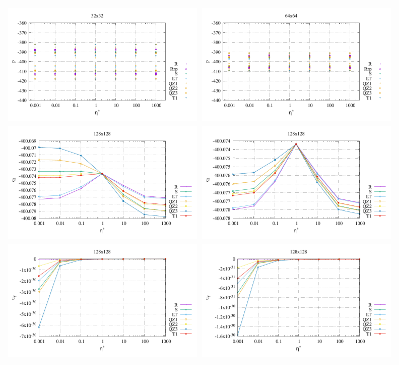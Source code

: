 \begin{center}
\includegraphics[width=5cm]{python_codes/fieldstone_78/results/exp08/p_block_res32.pdf}
\includegraphics[width=5cm]{python_codes/fieldstone_78/results/exp08/p_block_res64.pdf}\\
\includegraphics[width=5cm]{python_codes/fieldstone_78/results/exp08/q1_block_res32.pdf}
\includegraphics[width=5cm]{python_codes/fieldstone_78/results/exp08/q1_block_res64.pdf}\\
\includegraphics[width=5cm]{python_codes/fieldstone_78/results/exp08/v_block_res32.pdf}
\includegraphics[width=5cm]{python_codes/fieldstone_78/results/exp08/v_block_res64.pdf}\\
\end{center}


